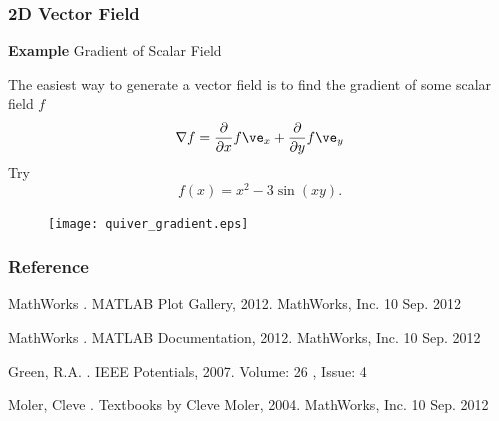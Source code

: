 \documentclass[compress]{beamer}  %
\begin{document}
\begin{frame}[fragile]
\frametitle{2D Vector Field}
\textbf{Example} Gradient of Scalar Field

The easiest way to generate a vector field is to find the gradient of some scalar field $f$
\begin{equation}
    \nabla f = \frac{\partial}{\partial x} f \ve_x + \frac{\partial}{\partial y} f \ve_y 
\end{equation}
\pause
Try
\begin{equation}
    f(x) = x^2 - 3\sin(xy).
\end{equation}

\begin{figure}
    \centering
    \texttt{[image: quiver\_gradient.eps]}
\end{figure}

\end{frame}
\begin{frame}[allowframebreaks]
\frametitle{Reference}
  \begin{thebibliography}{10}    
    MathWorks
    .
    \newblock MATLAB Plot Gallery, 2012. MathWorks, Inc. 10 Sep. 2012
  \end{thebibliography}

  \begin{thebibliography}{10}    
    MathWorks
    .
    \newblock MATLAB Documentation, 2012. MathWorks, Inc. 10 Sep. 2012
  \end{thebibliography}

  \begin{thebibliography}{10}    
    Green, R.A. 
    .
    \newblock IEEE Potentials, 2007. Volume: 26 , Issue: 4 
  \end{thebibliography}
  
  \begin{thebibliography}{10}    
    Moler, Cleve
    .
    \newblock Textbooks by Cleve Moler, 2004. MathWorks, Inc. 10 Sep. 2012
  \end{thebibliography}
  
\end{frame}
\end{document}
